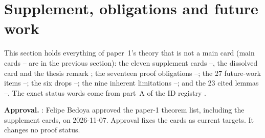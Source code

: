 \section{Supplement, obligations and future work}\label{sec:supp}

This section holds everything of paper~1's theory that is not a main card (main cards -- are in the previous section): the eleven supplement cards --, the dissolved card  and the thesis remark ; the seventeen proof obligations --; the 27 future-work items --; the six drops --; the nine inherent limitations --; and the 23 cited lemmas --. The exact status words come from part~A of the ID registry .

\textbf{Approval.} \approvedFB: Felipe Bedoya approved the paper-1 theorem list, including the supplement cards, on 2026-11-07. Approval fixes the cards as current targets. It changes no proof status.

